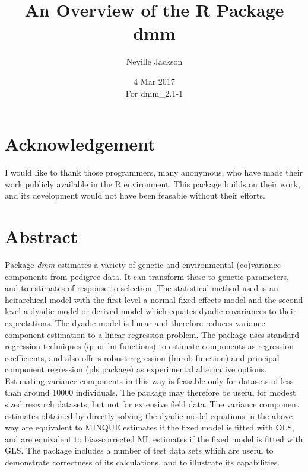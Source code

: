 \documentclass[titlepage]{article}  %
\title{ An Overview of the R Package dmm}
\author{Neville Jackson }
\date{4 Mar 2017 \\
      For dmm\_2.1-1}   %
\begin{document}
 
 
\maketitle      
\tableofcontents

\clearpage
\section{Acknowledgement}
 I would like to thank those programmers, many anonymous, who have made their work
publicly available in the R environment. This package builds on their work, and its
 development would not have been feasable without their efforts.

\clearpage
\section{Abstract}
 Package {\em dmm} estimates a variety of genetic and environmental (co)variance
components from pedigree data. It can transform these to genetic parameters, and to estimates of response to selection. The statistical method used is an heirarchical model with the first level a normal fixed effects model and the second level a dyadic model or derived model which equates dyadic covariances to their expectations. The dyadic model is linear and therefore reduces variance component estimation to a linear regression problem. 
The package uses standard regression techniques (qr or lm functions) to estimate components as regression coefficients, and also offers robust regression (lmrob function) and principal component regression (pls package) as experimental alternative options.
Estimating variance components in this way is feasable only for datasets of less than around 10000 individuals. The package may therefore be useful for modest sized research datasets, but not for extensive field data. The variance component estimates obtained by directly solving the dyadic model equations in the above way are equivalent to MINQUE estimates if the fixed model is fitted with OLS, and are equivalent to bias-corrected ML estimates if the fixed model is fitted with GLS. The package includes a number of test data sets which are useful to demonstrate correctness of its calculations, and to illustrate its capabilities.

\clearpage
\end{document}
